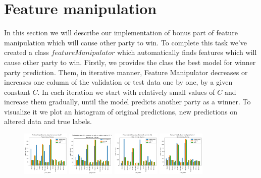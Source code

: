 \documentclass[12pt]{article}
\begin{document}
\newpage
\section{Feature manipulation}
In this section we will describe our implementation of bonus part of feature manipulation which will cause other party to win. To complete this task we've created a class $featureManipulator$ which automatically finds features which will cause other party to win. Firstly, we provides the class the best model for winner party prediction. Them, in iterative manner, Feature Manipulator decreases or increases one column of the validation or test data one by one, by a given constant $C$. In each iteration we start with relatively small values of $C$ and increase them gradually, until the model predicts another party as a winner. To visualize it we plot an histogram of original predictions, new predictions on altered data and true labels.   

\begin{figure}[ht]
	\centering
	\includegraphics[width=0.2\textwidth]{dramatic_feature/Avg_education_importance_increased}
	\includegraphics[width=0.2\textwidth]{dramatic_feature/Avg_monthly_expense_on_pets_or_plants_increased}
	\includegraphics[width=0.2\textwidth]{dramatic_feature/Weighted_education_rank_increased}	
	\includegraphics[width=0.2\textwidth]{dramatic_feature/Yearly_ExpensesK_increased}					
\end{figure}
\end{document}
